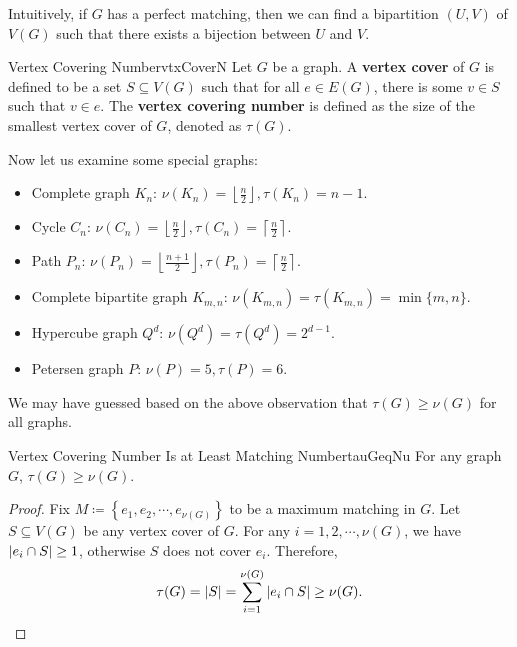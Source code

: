 \documentclass[math]{amznotes}
\theoremstyle{remark}
\newcommand{\0}{\mathbf{0}}
\newcommand{\1}{\mathbf{1}}
\begin{document}
Intuitively, if $G$ has a perfect matching, then we can find a bipartition $(U, V)$ of $V(G)$ such that there exists a bijection between $U$ and $V$.
\begin{dfnbox}{Vertex Covering Number}{vtxCoverN}
    Let $G$ be a graph. A {\color{red} \textbf{vertex cover}} of $G$ is defined to be a set $S \subseteq V(G)$ such that for all $e \in E(G)$, there is some $v \in S$ such that $v \in e$. The {\color{red} \textbf{vertex covering number}} is defined as the size of the smallest vertex cover of $G$, denoted as $\tau(G)$.
\end{dfnbox}
Now let us examine some special graphs:
\begin{itemize}
    \item Complete graph $K_n$: $\nu(K_n) = \left\lfloor\frac{n}{2}\right\rfloor, \tau(K_n) = n - 1$.
    \item Cycle $C_n$: $\nu(C_n) = \left\lfloor\frac{n}{2}\right\rfloor, \tau(C_n) = \left\lceil\frac{n}{2}\right\rceil$.
    \item Path $P_n$: $\nu(P_n) = \left\lfloor\frac{n + 1}{2}\right\rfloor, \tau(P_n) = \left\lceil\frac{n}{2}\right\rceil$.
    \item Complete bipartite graph $K_{m, n}$: $\nu(K_{m, n}) = \tau(K_{m, n}) = \min\{m, n\}$.
    \item Hypercube graph $Q^d$: $\nu(Q^d) = \tau(Q^d) = 2^{d - 1}$.
    \item Petersen graph $P$: $\nu(P) = 5, \tau(P) = 6$.
\end{itemize}
We may have guessed based on the above observation that $\tau(G) \geq \nu(G)$ for all graphs.
\begin{probox}{Vertex Covering Number Is at Least Matching Number}{tauGeqNu}
    For any graph $G$, $\tau(G) \geq \nu(G)$.
    \tcblower
    \begin{proof}
        Fix $M \coloneqq \left\{e_1, e_2, \cdots, e_{\nu(G)}\right\}$ to be a maximum matching in $G$. Let $S \subseteq V(G)$ be any vertex cover of $G$. For any $i = 1, 2, \cdots, \nu(G)$, we have ${\left\lvert {e_i \cap S} \right\rvert} \geq 1$, otherwise $S$ does not cover $e_i$. Therefore,
        \begin{equation*}
            \tau(G) = {\left\lvert {S} \right\rvert} = \sum_{i = 1}^{\nu(G)}{\left\lvert {e_i \cap S} \right\rvert} \geq \nu(G).
        \end{equation*}
    \end{proof}
\end{probox}
\end{document}
